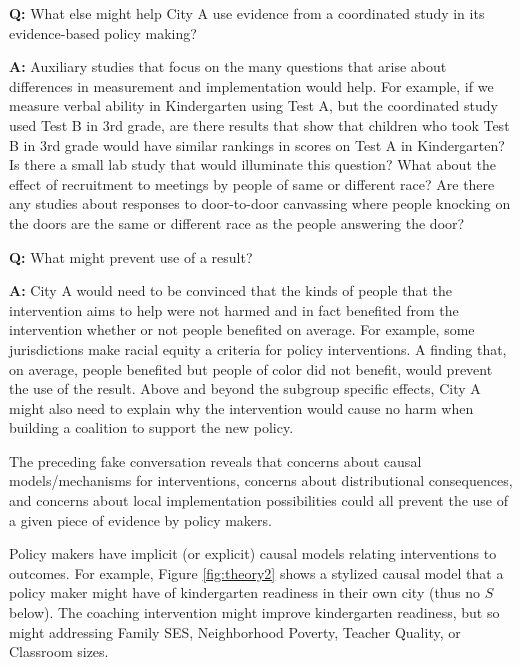 \documentclass[
  11pt,
]{article}
\begin{document}
\textbf{Q:} What else might help City A use evidence from a coordinated
study in its evidence-based policy making?

\textbf{A:} Auxiliary studies that focus on the many questions that
arise about differences in measurement and implementation would help.
For example, if we measure verbal ability in Kindergarten using Test A,
but the coordinated study used Test B in 3rd grade, are there results
that show that children who took Test B in 3rd grade would have similar
rankings in scores on Test A in Kindergarten? Is there a small lab study
that would illuminate this question? What about the effect of
recruitment to meetings by people of same or different race? Are there
any studies about responses to door-to-door canvassing where people
knocking on the doors are the same or different race as the people
answering the door?

\textbf{Q:} What might prevent use of a result?

\textbf{A:} City A would need to be convinced that the kinds of people
that the intervention aims to help were not harmed and in fact benefited
from the intervention whether or not people benefited on average. For
example, some jurisdictions make racial equity a criteria for policy
interventions. A finding that, on average, people benefited but people
of color did not benefit, would prevent the use of the result. Above and
beyond the subgroup specific effects, City A might also need to explain
why the intervention would cause no harm when building a coalition to
support the new policy.

\medskip

The preceding fake conversation reveals that concerns about causal
models/mechanisms for interventions, concerns about distributional
consequences, and concerns about local implementation possibilities
could all prevent the use of a given piece of evidence by policy makers.

Policy makers have implicit (or explicit) causal models relating
interventions to outcomes. For example, Figure \ref{fig:theory2} shows a
stylized causal model that a policy maker might have of kindergarten
readiness in their own city (thus no \(\boxed{S}\) below). The coaching
intervention might improve kindergarten readiness, but so might
addressing Family SES, Neighborhood Poverty, Teacher Quality, or
Classroom sizes.
\end{document}
